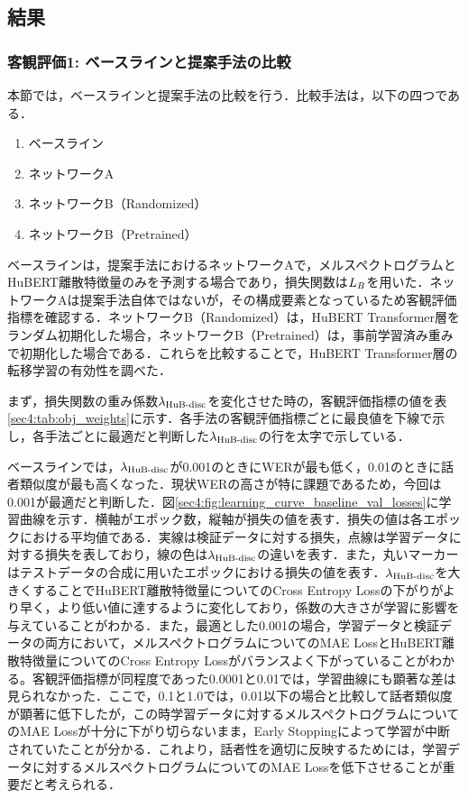 \subsection{結果}
\subsubsection{客観評価1: ベースラインと提案手法の比較}
\label{sec4:sec:obj_1}
本節では，ベースラインと提案手法の比較を行う．比較手法は，以下の四つである．
\begin{enumerate}
    \item ベースライン
    \item ネットワークA
    \item ネットワークB（Randomized）
    \item ネットワークB（Pretrained）
\end{enumerate}
ベースラインは，提案手法におけるネットワークAで，メルスペクトログラムとHuBERT離散特徴量のみを予測する場合であり，損失関数は$L_{B}$を用いた．ネットワークAは提案手法自体ではないが，その構成要素となっているため客観評価指標を確認する．ネットワークB（Randomized）は，HuBERT Transformer層をランダム初期化した場合，ネットワークB（Pretrained）は，事前学習済み重みで初期化した場合である．これらを比較することで，HuBERT Transformer層の転移学習の有効性を調べた．

まず，損失関数の重み係数$\lambda_{\text{HuB-disc}}$を変化させた時の，客観評価指標の値を表\ref{sec4:tab:obj_weights}に示す．各手法の客観評価指標ごとに最良値を下線で示し，各手法ごとに最適だと判断した$\lambda_{\text{HuB-disc}}$の行を太字で示している．

ベースラインでは，$\lambda_{\text{HuB-disc}}$が0.001のときにWERが最も低く，0.01のときに話者類似度が最も高くなった．現状WERの高さが特に課題であるため，今回は0.001が最適だと判断した．図\ref{sec4:fig:learning_curve_baseline_val_losses}に学習曲線を示す．横軸がエポック数，縦軸が損失の値を表す．損失の値は各エポックにおける平均値である．実線は検証データに対する損失，点線は学習データに対する損失を表しており，線の色は$\lambda_{\text{HuB-disc}}$の違いを表す．また，丸いマーカーはテストデータの合成に用いたエポックにおける損失の値を表す．$\lambda_{\text{HuB-disc}}$を大きくすることでHuBERT離散特徴量についてのCross Entropy Lossの下がりがより早く，より低い値に達するように変化しており，係数の大きさが学習に影響を与えていることがわかる．また，最適とした0.001の場合，学習データと検証データの両方において，メルスペクトログラムについてのMAE LossとHuBERT離散特徴量についてのCross Entropy Lossがバランスよく下がっていることがわかる。客観評価指標が同程度であった0.0001と0.01では，学習曲線にも顕著な差は見られなかった．ここで，0.1と1.0では，0.01以下の場合と比較して話者類似度が顕著に低下したが，この時学習データに対するメルスペクトログラムについてのMAE Lossが十分に下がり切らないまま，Early Stoppingによって学習が中断されていたことが分かる．これより，話者性を適切に反映するためには，学習データに対するメルスペクトログラムについてのMAE Lossを低下させることが重要だと考えられる．

